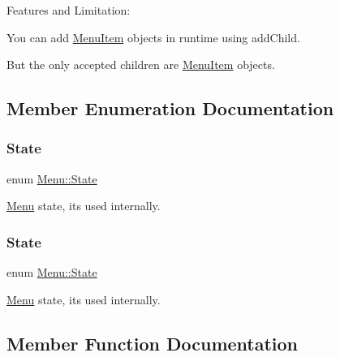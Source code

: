 Features and Limitation\+:
\begin{DoxyItemize}
\item You can add \hyperlink{classMenuItem}{Menu\+Item} objects in runtime using add\+Child.
\item But the only accepted children are \hyperlink{classMenuItem}{Menu\+Item} objects. 
\end{DoxyItemize}

\subsection{Member Enumeration Documentation}
\mbox{\label{classMenu_a8269685e78203b028d5bd77c339898b2}} 
\subsubsection{\texorpdfstring{State}{State}\hspace{0.1cm}{\footnotesize\ttfamily [1/2]}}
{\footnotesize\ttfamily enum \hyperlink{classMenu_a8269685e78203b028d5bd77c339898b2}{Menu\+::\+State}\hspace{0.3cm}{\ttfamily [strong]}}

\hyperlink{classMenu}{Menu} state, it\textquotesingle{}s used internally. \mbox{\label{classMenu_a8269685e78203b028d5bd77c339898b2}} 
\subsubsection{\texorpdfstring{State}{State}\hspace{0.1cm}{\footnotesize\ttfamily [2/2]}}
{\footnotesize\ttfamily enum \hyperlink{classMenu_a8269685e78203b028d5bd77c339898b2}{Menu\+::\+State}\hspace{0.3cm}{\ttfamily [strong]}}

\hyperlink{classMenu}{Menu} state, it\textquotesingle{}s used internally. 

\subsection{Member Function Documentation}
\mbox{\label{classMenu_af557403e8b14bdbda70d85b7d12fedfb}} 
